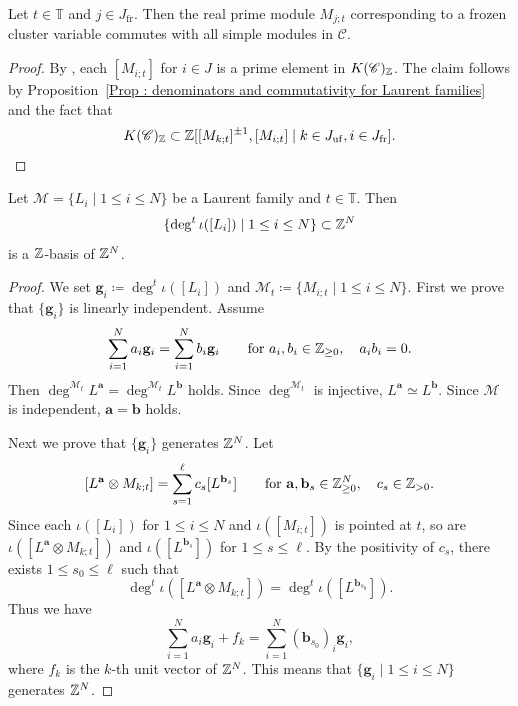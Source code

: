 \begin{Prop}\label{Prop : frozen commutativity}
  Let $t \in \mathbb{T}$ and $j \in J_{\mathrm{fr}}$. 
  Then the real prime module $M_{j ; t}$ corresponding to a frozen cluster variable commutes with 
  all simple modules in $\mathscr{C}$. 
\end{Prop}
\begin{proof}
  By \cite{GLSclu}, each $[M_{i ; t}]$ for $i \in J$ is a prime element in $K(\mathscr{C})_{\mathbb{Z}}$. 
  The claim follows by Proposition~\ref{Prop : denominators and commutativity for Laurent families} 
  and the fact that 
  \[
  K(\mathscr{C})_{\mathbb{Z}} \subset 
  \mathbb{Z}[[M_{k ; t}]^{\pm 1}, [M_{i ; t}] \mid k \in J_{\mathrm{uf}}, i \in J_{\mathrm{fr}}]. 
  \]
\end{proof}

\begin{Prop}
\label{Prop : degrees of Laurent families form an integral basis}
Let $\mathcal{M} = \{L_i \mid 1 \leq i \leq N\}$
be a Laurent family and $t \in \mathbb{T}$.
Then
\[
\{\deg^t\iota([L_i]) \mid 1 \leq i \leq N\} \subset \mathbb{Z}^N
\]
is a $\mathbb{Z}$-basis of $\mathbb{Z}^N$.
\end{Prop}

\begin{proof}
We set $\mathbf{g}_i \coloneq \deg^t\iota([L_i])$ and
$\mathcal{M}_t \coloneq \{M_{i;t} \mid 1 \leq i \leq N\}$.
First we prove that $\{\mathbf{g}_i\}$ is linearly independent.
Assume
\[
\sum_{i=1}^N a_i\mathbf{g}_i
= \sum_{i=1}^N b_i\mathbf{g}_i
\qquad\text{for }a_i, b_i \in \mathbb{Z}_{\geq 0},\quad a_i b_i = 0.
\]
Then $\deg^{\mathcal{M}_t}L^{\mathbf{a}}
= \deg^{\mathcal{M}_t}L^{\mathbf{b}}$ holds.
Since $\deg^{\mathcal{M}_t}$ is injective,
$L^{\mathbf{a}} \simeq L^{\mathbf{b}}$.
Since $\mathcal{M}$ is independent, $\mathbf{a} = \mathbf{b}$ holds.

Next we prove that $\{\mathbf{g}_i\}$ generates $\mathbb{Z}^N$.
Let
\[
[L^{\mathbf{a}}\otimes M_{k;t}]
= \sum_{s=1}^{\ell}c_s[L^{\mathbf{b}_s}]
\qquad\text{for }\mathbf{a}, \mathbf{b}_s \in \mathbb{Z}_{\geq 0}^N,
\quad c_s \in \mathbb{Z}_{>0}.
\]
Since each $\iota([L_i])$ for $1 \leq i \leq N$
and $\iota([M_{i;t}])$ is pointed at $t$,
so are $\iota([L^{\mathbf{a}}\otimes M_{k;t}])$
and $\iota([L^{\mathbf{b}_s}])$ for $1 \leq s \leq \ell$.
By the positivity of $c_s$, there exists $1 \leq s_0 \leq \ell$
such that
\[
\deg^t\iota([L^{\mathbf{a}}\otimes M_{k;t}])
= \deg^t\iota([L^{\mathbf{b}_{s_0}}]).
\]
Thus we have
\[
\sum_{i=1}^N a_i\mathbf{g}_i + f_k
= \sum_{i=1}^N(\mathbf{b}_{s_0})_i\mathbf{g}_i,
\]
where $f_k$ is the $k$-th unit vector of $\mathbb{Z}^N$.
This means that $\{\mathbf{g}_i \mid 1 \leq i \leq N\}$
generates $\mathbb{Z}^N$.
\end{proof}

